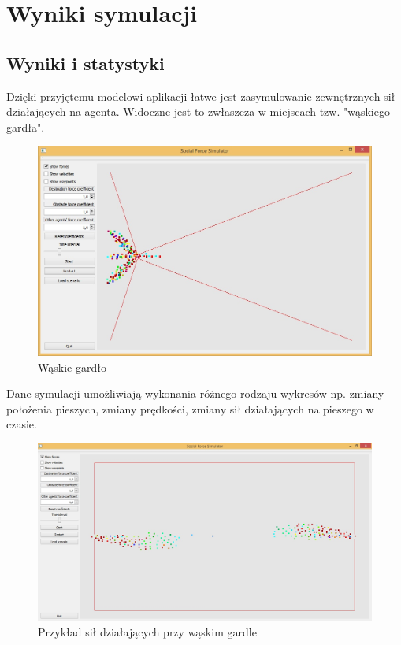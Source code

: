 \chapter{Wyniki symulacji}
\section{Wyniki i statystyki}
Dzięki przyjętemu modelowi aplikacji łatwe jest zasymulowanie zewnętrznych sił działających na agenta. Widoczne jest to zwłaszcza w miejscach tzw. "wąskiego gardła".

\begin{figure}[h]
\centering
\includegraphics[scale=0.4]{waskie_gardlo_przyklad}
\caption{Wąskie gardło}
\end{figure}

Dane symulacji umożliwiają wykonania różnego rodzaju wykresów np. zmiany położenia pieszych, zmiany prędkości, zmiany sił działających na pieszego w czasie. 

\begin{figure}[h]
\centering
\includegraphics[scale=0.4]{przyklad_sil_dzialajacych_przy_waskim_gardle}
\caption{Przykład sił działających przy wąskim gardle}
\end{figure}

